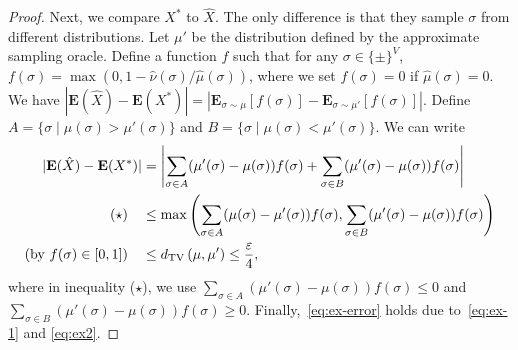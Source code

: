 \begin{proof}
Next, we compare $X^*$ to $\hat X$. The only difference is that they sample $\sigma$ from different distributions. Let $\mu'$ be the distribution defined by the approximate sampling oracle.
Define a function $f$ such that for any $\sigma \in \{\pm\}^V$, $f(\sigma) = \max(0,1-{\hat{\nu}(\sigma)}/{\hat{\mu}(\sigma)})$, where we set $f(\sigma) = 0$ if $\hat \mu (\sigma) = 0$.
We have $|\mathbf{E}(\hat X)-\mathbf{E}(X^*)|=\left | \mathbf{E}_{\sigma\sim \mu}[f(\sigma)]-\mathbf{E}_{\sigma\sim \mu'}[f(\sigma)] \right |$. 
Define $A = \{\sigma\mid \mu(\sigma)>\mu'(\sigma)\}$ and $B = \{\sigma \mid \mu(\sigma)<\mu'(\sigma)\}$.
We can write
\begin{align}\label{eq:ex2}
    |\mathbf{E}(\hat X)-\mathbf{E}(X^*)| &=
     \left | \sum_{\sigma \in A} (\mu'(\sigma)-\mu(\sigma))f(\sigma) + \sum_{\sigma \in B} (\mu'(\sigma)-\mu(\sigma))f(\sigma) \right|\notag\\
\text{($\star$)}\quad    &\leq \max \left(\sum_{\sigma \in A} (\mu(\sigma)-\mu'(\sigma))f(\sigma),\sum_{\sigma \in B} (\mu'(\sigma)-\mu(\sigma))f(\sigma)\right)\notag\\
\text{(by $f(\sigma) \in [0,1]$)}\quad    &\leq d_{\mathrm{TV}}\left({\mu},{\mu'}\right)\leq \frac{\varepsilon}{4},
\end{align}
where in inequality ($\star$), we use $\sum_{\sigma \in A} (\mu'(\sigma)-\mu(\sigma))f(\sigma) \leq 0$ and $\sum_{\sigma \in B} (\mu'(\sigma)-\mu(\sigma))f(\sigma) \geq 0$.
Finally,~\eqref{eq:ex-error} holds due to~\eqref{eq:ex-1} and \eqref{eq:ex2}.
\end{proof}

